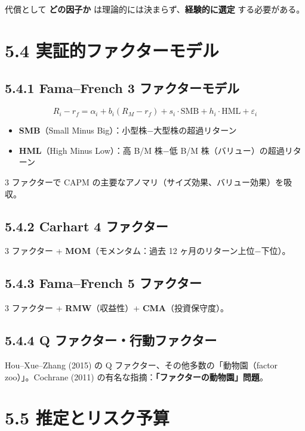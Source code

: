 \documentclass[11pt,a4paper]{report}
\begin{document}
代償として \textbf{どの因子か} は理論的には決まらず、\textbf{経験的に選定} する必要がある。

\section{5.4 実証的ファクターモデル}

\subsection{5.4.1 Fama–French 3 ファクターモデル}

\[ R_i - r_f = \alpha_i + b_i (R_M - r_f) + s_i \cdot \mathrm{SMB} + h_i \cdot \mathrm{HML} + \varepsilon_i \]
\begin{itemize}
\item \textbf{SMB}（Small Minus Big）：小型株−大型株の超過リターン
\item \textbf{HML}（High Minus Low）：高 B/M 株−低 B/M 株（バリュー）の超過リターン
\end{itemize}

3 ファクターで CAPM の主要なアノマリ（サイズ効果、バリュー効果）を吸収。

\subsection{5.4.2 Carhart 4 ファクター}

3 ファクター + \textbf{MOM}（モメンタム：過去 12 ヶ月のリターン上位−下位）。

\subsection{5.4.3 Fama–French 5 ファクター}

3 ファクター + \textbf{RMW}（収益性）+ \textbf{CMA}（投資保守度）。

\subsection{5.4.4 Q ファクター・行動ファクター}

Hou–Xue–Zhang (2015) の Q ファクター、その他多数の「動物園（factor zoo）」。Cochrane (2011) の有名な指摘：\textbf{「ファクターの動物園」問題}。

\section{5.5 推定とリスク予算}
\end{document}
